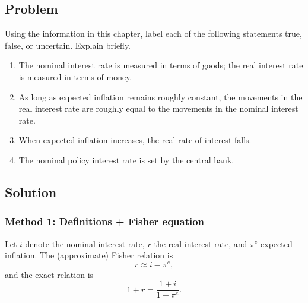 \documentclass[12pt]{article}
\begin{document}
\subsection*{Problem}
Using the information in this chapter, label each of the following statements true, false, or uncertain. Explain briefly.
\begin{enumerate}[label=(\alph*)]
  \item The nominal interest rate is measured in terms of goods; the real interest rate is measured in terms of money.
  \item As long as expected inflation remains roughly constant, the movements in the real interest rate are roughly equal to the movements in the nominal interest rate.
  \item When expected inflation increases, the real rate of interest falls.
  \item The nominal policy interest rate is set by the central bank.
\end{enumerate}

\subsection*{Solution}

\subsubsection*{Method 1: Definitions + Fisher equation}
Let \(i\) denote the nominal interest rate, \(r\) the real interest rate, and \(\pi^e\) expected inflation.
The (approximate) Fisher relation is
\[
r \approx i - \pi^e,
\]
and the exact relation is
\[
1+r = \frac{1+i}{1+\pi^e}.
\]
\end{document}
